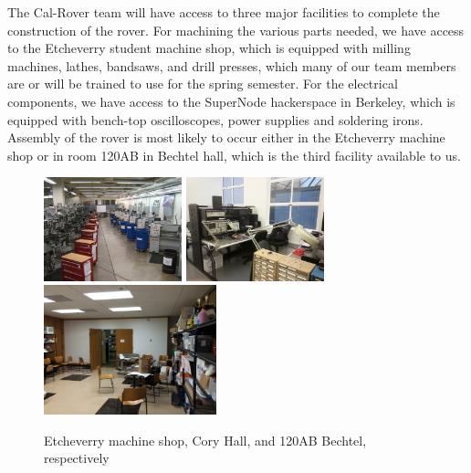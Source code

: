 \documentclass[titlepage,twocolumn,10pt]{article}
\begin{document}
    The Cal-Rover team will have access to three major facilities to complete the construction of the rover. For machining the various parts needed, we have access to the Etcheverry student machine shop, which is equipped with milling machines, lathes, bandsaws, and drill presses, which many of our team members are or will be trained to use for the spring semester. For the electrical components, we have access to the SuperNode hackerspace in Berkeley, which is equipped with bench-top oscilloscopes, power supplies and soldering irons. Assembly of the rover is most likely to occur either in the Etcheverry machine shop or in room 120AB in Bechtel hall, which is the third facility available to us.
   
    \begin{figure}[H]
        \centering
        \includegraphics*[width = 4cm]{images/etch.jpg}
        \includegraphics*[width = 4cm]{images/cory.jpg}
        \includegraphics*[width = 5cm]{images/becht.jpg}
        \caption{Etcheverry machine shop, Cory Hall, and 120AB Bechtel, respectively} 
    \end{figure}
\end{document}
